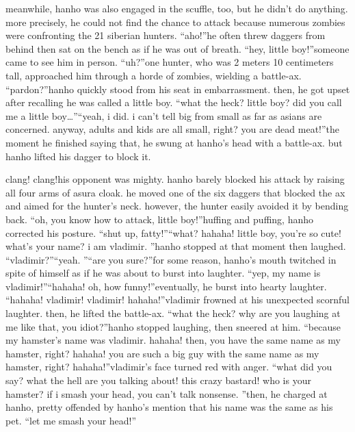 meanwhile, hanho was also engaged in the scuffle, too, but he didn’t do anything.
 more precisely, he could not find the chance to attack because numerous zombies were confronting the 21 siberian hunters.
“aho!”he often threw daggers from behind then sat on the bench as if he was out of breath.
“hey, little boy!”someone came to see him in person.
“uh?”one hunter, who was 2 meters 10 centimeters tall, approached him through a horde of zombies, wielding a battle-ax.
“pardon?”hanho quickly stood from his seat in embarrassment.
then, he got upset after recalling he was called a little boy.
“what the heck? little boy? did you call me a little boy…”“yeah, i did.
 i can’t tell big from small as far as asians are concerned.
 anyway, adults and kids are all small, right? you are dead meat!”the moment he finished saying that, he swung at hanho’s head with a battle-ax.
but hanho lifted his dagger to block it.


clang! clang!his opponent was mighty.
 hanho barely blocked his attack by raising all four arms of asura cloak.
 he moved one of the six daggers that blocked the ax and aimed for the hunter’s neck.
 however, the hunter easily avoided it by bending back.
“oh, you know how to attack, little boy!”huffing and puffing, hanho corrected his posture.
“shut up, fatty!”“what? hahaha! little boy, you’re so cute! what’s your name? i am vladimir.
”hanho stopped at that moment then laughed.
“vladimir?”“yeah.
”“are you sure?”for some reason, hanho’s mouth twitched in spite of himself as if he was about to burst into laughter.
“yep, my name is vladimir!”“hahaha! oh, how funny!”eventually, he burst into hearty laughter.
“hahaha! vladimir! vladimir! hahaha!”vladimir frowned at his unexpected scornful laughter.
 then, he lifted the battle-ax.
“what the heck? why are you laughing at me like that, you idiot?”hanho stopped laughing, then sneered at him.
“because my hamster’s name was vladimir.
 hahaha! then, you have the same name as my hamster, right? hahaha! you are such a big guy with the same name as my hamster, right? hahaha!”vladimir’s face turned red with anger.
“what did you say? what the hell are you talking about! this crazy bastard! who is your hamster? if i smash your head, you can’t talk nonsense.
”then, he charged at hanho, pretty offended by hanho’s mention that his name was the same as his pet.
“let me smash your head!”

 